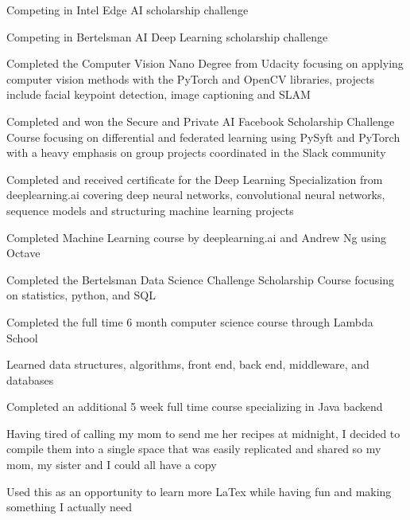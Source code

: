 \documentclass[letterpaper]{resume}
\begin{document}
\begin{compactitem}
\item Competing in Intel Edge AI scholarship challenge
\item Competing in Bertelsman AI Deep Learning scholarship challenge
\item Completed the Computer Vision Nano Degree from Udacity focusing on applying computer vision methods with the PyTorch and OpenCV libraries, projects include facial keypoint detection, image captioning and SLAM
\item Completed and won the Secure and Private AI Facebook Scholarship Challenge Course focusing on differential and federated learning using PySyft and PyTorch with a heavy emphasis on group projects coordinated in the Slack community
\item Completed and received certificate for the Deep Learning Specialization from deeplearning.ai covering deep neural networks, convolutional neural networks, sequence models and structuring machine learning projects
\item Completed Machine Learning course by deeplearning.ai and Andrew Ng using Octave
\item Completed the Bertelsman Data Science Challenge Scholarship Course focusing on statistics, python, and SQL
\end{compactitem}

\begin{compactitem}
\item Completed the full time 6 month computer science course through Lambda School
\item Learned data structures, algorithms, front end, back end, middleware, and databases
\item Completed an additional 5 week full time course specializing in Java backend
\end{compactitem}

\begin{compactitem}
\item Having tired of calling my mom to send me her recipes at midnight, I decided to compile them into a single space that was easily replicated and shared so my mom, my sister and I could all have a copy
\item Used this as an opportunity to learn more LaTex while having fun and making something I actually need
\end{compactitem}
\end{document}
